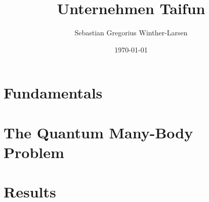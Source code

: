 \documentclass[twoside, english, notitlepage, 10pt]{uiofysmaster}
\author{Sebastian Gregorius Winther-Larsen}
\title{Unternehmen Taifun}
\date{\today}
\begin{document}
\frontmatter
    \maketitle

    \tableofcontents

\mainmatter

    \part{Fundamentals}

        
        

    \part{The Quantum Many-Body Problem}

        

    \part{Results}

        

    \appendix

        

        
\printbibliography
\end{document}

